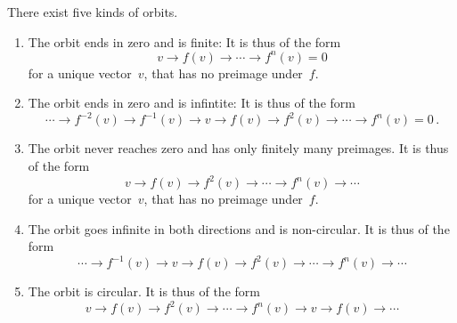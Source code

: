 \documentclass[a4paper, 11pt, twoside=semi]{scrartcl}
\begin{document}
There exist five kinds of orbits.
\begin{enumerate}[label = Type~\Alph*.]
  \item
    \label{finite nilpotent orbit}
    The orbit ends in zero and is finite:
    It is thus of the form
    \[
      v
      \to
      f(v)
      \to
      \dotsb
      \to
      f^n(v)
      =
      0
    \]
    for a unique vector~$v$, that has no preimage under~$f$.
  \item
    \label{infinite nilpotent orbit}
    The orbit ends in zero and is infintite:
    It is thus of the form
    \[
      \dotsb
      \to
      f^{-2}(v)
      \to
      f^{-1}(v)
      \to
      v
      \to
      f(v)
      \to
      f^2(v)
      \to
      \dotsb
      \to
      f^n(v)
      =
      0 \,.
    \]
  \item
    \label{infinite onesided}
    The orbit never reaches zero and has only finitely many preimages.
    It is thus of the form
    \[
      v
      \to
      f(v)
      \to
      f^2(v)
      \to
      \dotsb
      \to
      f^n(v)
      \to
      \dotsb
    \]
    for a unique vector~$v$, that has no preimage under~$f$.
  \item
    \label{infinite twosided orbit}
    The orbit goes infinite in both directions and is non-circular.
    It is thus of the form
    \[
      \dotsb
      \to
      f^{-1}(v)
      \to
      v
      \to
      f(v)
      \to
      f^2(v)
      \to
      \dotsb
      \to
      f^n(v)
      \to
      \dotsb
    \]
  \item
    \label{circle orbit}
    The orbit is circular.
    It is thus of the form
    \[
      v
      \to
      f(v)
      \to
      f^2(v)
      \to
      \dotsb
      \to
      f^n(v)
      \to
      v
      \to
      f(v)
      \to
      \dotsb
    \]
\end{enumerate}
\end{document}
